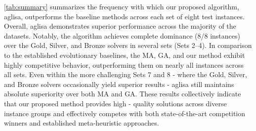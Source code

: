 \documentclass[preprint,12pt]{elsarticle}
\begin{document}
\autoref{tab:summary} summarizes the frequency with which our proposed algorithm, \gls{aglisa}, outperforms the baseline methods across each set of eight test instances. Overall, \gls{aglisa} demonstrates superior performance across the majority of the datasets. Notably, the algorithm achieves complete dominance (8/8 instances) over the Gold, Silver, and Bronze solvers in several sets (Sets 2–4). In comparison to the established evolutionary baselines, the MA, GA, and our method exhibit highly competitive behavior, outperforming them on nearly all instances across all sets. Even within the more challenging Sets 7 and 8 - where the Gold, Silver, and Bronze solvers occasionally yield superior results - \gls{aglisa} still maintains absolute superiority over both MA and GA. These results collectively indicate that our proposed method provides high - quality solutions across diverse instance groups and effectively competes with both state-of-the-art competition winners and established meta-heuristic approaches.

\begin{table}[htp]
\centering
\caption{Comparison of performance across eight instance sets. Each value indicates how many instances (out of 8) in which \gls{aglisa} algorithm achieves better results than the corresponding baseline method.}\label{tab:summary}
\end{table}
\end{document}
